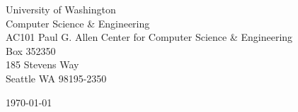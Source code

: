 \begin{minipage}{0.49\textwidth}
\begin{flushleft}
\noindent
University of Washington\\
Computer Science \& Engineering\\
AC101 Paul G. Allen Center for Computer Science \& Engineering\\
Box 352350\\
185 Stevens Way\\
Seattle WA 98195-2350
\end{flushleft}
\end{minipage}
\begin{minipage}{0.47\textwidth}
\begin{flushright}
\today
\end{flushright}
\end{minipage} \\

\newcommand{\univ}{University of Washington}
\newcommand{\univshort}{UW}
\newcommand{\degree}{Ph.D.}
\newcommand{\dept}{Computer Science and Engineering}
